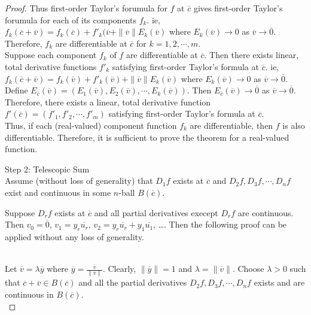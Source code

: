 \begin{proof}
	Thus first-order Taylor's forumula for $f$ at $\overline{c}$ gives first-order Taylor's forumula for each of its components $f_k$.
	ie, $f_k(\overline{c}+\overline{v}) = f_k(\overline{c}) + f'_k(\overline{v} + \|\overline{v}\|E_k(\overline{v})$ where $E_k(\overline{v}) \to 0$ as $\overline{v} \to \overline{0}$.
	Therefore, $f_k$ are differentiable at $\overline{c}$ for $k = 1,2,\cdots, m$.\\

	Suppose each component $f_k$ of $f$ are differentiable at $\overline{c}$.
	Then there exists linear, total derivative functions $f'_k$ satisfying first-order Taylor's formula at $\overline{c}$.
	ie, $f_k(\overline{c}+\overline{v}) = f_k(\overline{v}) + f'_k(\overline{v}) + \|\overline{v}\|E_k(\overline{v})$ where $E_k(\overline{v}) \to 0$ as $\overline{v} \to \overline{0}$.\\
	
	Define $E_{\overline{c}}(\overline{v}) = \left( E_1(\overline{v}), E_2(\overline{v}), \cdots, E_k(\overline{v}) \right)$.
	Then $E_{\overline{c}}(\overline{v}) \to \overline{0}$ as $\overline{v} \to \overline{0}$.
	Therefore, there exists a linear, total derivative function $f'(\overline{c}) = \left( f'_1, f'_2, \cdots, f'_m \right)$ satisfying first-order Taylor's formula at $\overline{c}$.\\

	Thus, if each (real-valued) component function $f_k$ are differentiable, then $f$ is also differentiable.
	Therefore, it is sufficient to prove the theorem for a real-valued function.\\

	\par{Step 2: } Telescopic Sum\\

	Assume (without loss of generality) that $D_1f$ exists at $\overline{c}$ and $D_2f,D_3f,\cdots,D_nf$ exist and continuous in some $n$-ball $B(\overline{c})$.
	\begin{commentary} Suppose $D_rf$ exists at $\overline{c}$ and all partial derivatives execept $D_rf$ are continuous.
	Then $v_0 = \overline{0}$, $v_1 = y_r\overline{u_r}$, $v_2 = y_r\overline{u_r} + y_1\overline{u_1}$, \dots.
	Then the following proof can be applied without any loss of generality. \end{commentary}\\

	Let $\overline{v} = \lambda\overline{y}$ where $\overline{y} = \frac{\overline{v}}{\|\overline{v}\|}$.
	Clearly, $\|\overline{y}\| = 1$ and $\lambda = \| \overline{v} \|$.
	Choose $\lambda > 0$ such that $\overline{c}+\overline{v} \in B(\overline{c})$ and all the partial derivatives $D_2f, D_3f, \cdots, D_nf$ exists and are continuous in $B(\overline{c})$.\\


\end{proof}
